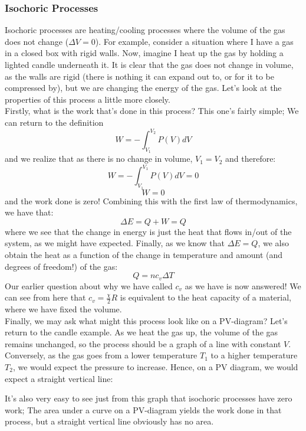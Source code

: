\subsubsection{Isochoric Processes}
Isochoric processes are heating/cooling processes where the volume of the gas does not change ($\Delta V =0$). For example, consider a situation where I have a gas in a closed box with rigid walls. Now, imagine I heat up the gas by holding a lighted candle underneath it. It is clear that the gas does not change in volume, as the walls are rigid (there is nothing it can expand out to, or for it to be compressed by), but we are changing the energy of the gas. Let's look at the properties of this process a little more closely.\\

Firstly, what is the work that's done in this process? This one's fairly simple; We can return to the definition \[ W = -\int_{V_1}^{V_2} P(V)dV \] and we realize that as there is no change in volume, $V_1 = V_2$ and therefore: \[ W = -\int_{V_1}^{V_1} P(V)dV = 0 \]
\begin{equation}
    W=0
\end{equation}
and the work done is zero! Combining this with the first law of thermodynamics, we have that: \[\Delta E = Q + W = Q \]
where we see that the change in energy is just the heat that flows in/out of the system, as we might have expected. Finally, as we know that $\Delta E = Q$, we also obtain the heat as a function of the change in temperature and amount (and degrees of freedom!) of the gas:
\begin{equation} 
Q = nc_v\Delta T
\end{equation}
Our earlier question about why we have called $c_v$ as we have is now answered! We can see from here that $c_v = \frac{\chi}{2}R$ is equivalent to the heat capacity of a material, where we have fixed the volume. \\Finally, we may ask what might this process look like on a PV-diagram? Let's return to the candle example. As we heat the gas up, the volume of the gas remains unchanged, so the process should be a graph of a line with constant $V$. Conversely, as the gas goes from a lower temperature $T_1$ to a higher temperature $T_2$, we would expect the pressure to increase. Hence, on a PV diagram, we would expect a straight vertical line:
\begin{center}
\end{center}
It's also very easy to see just from this graph that isochoric processes have zero work; The area under a curve on a PV-diagram yields the work done in that process, but a straight vertical line obviously has no area. 